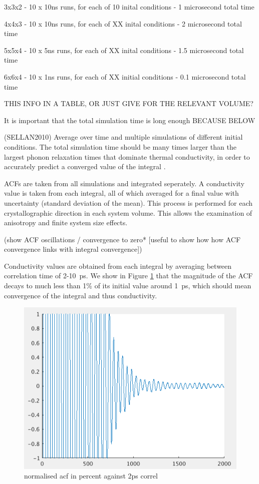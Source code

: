 \documentclass[%
preprint,                                  %
nofootinbib,
 amsmath,amssymb,
 aps,
]{revtex4-1}
\begin{document}
3x3x2 - 10 x 10ns runs, for each of 10 inital conditions - 1 microsecond total time

4x4x3 - 10 x 10ns runs, for each of XX inital conditions - 2 microsecond total time

5x5x4 - 10 x 5ns runs, for each of XX inital conditions - 1.5 microsecond total time 

6x6x4 - 10 x 1ns runs, for each of XX initial conditions - 0.1 microsecond total time

THIS INFO IN A TABLE, OR JUST GIVE FOR THE RELEVANT VOLUME?

It is important that the total simulation time is long enough BECAUSE BELOW

(SELLAN2010) Average over time and multiple simulations of different initial conditions. The total simulation time should be many times larger than the largest phonon relaxation times that dominate thermal conductivity, in order to accurately predict a converged value of the integral .

ACFs are taken from all simulations and integrated seperately. A conductivity value is taken from each integral, all of which averaged for a final value with uncertainty (standard deviation of the mean). This process is performed for each crystallographic direction in each system volume. This allows the examination of anisotropy and finite system size effects.

(show ACF oscillations / convergence to zero* [useful to show how how ACF convergence links with integral convergence])

Conductivity values are obtained from each integral by averaging between correlation time of 2-10~ps. We show in Figure \ref{fig:acf_decay} that the magnitude of the ACF decays to much less than 1\% of its initial value around 1~ps, which should mean convergence of the integral and thus conductivity. %

\begin{figure}[h!]
  \includegraphics[width=\linewidth]{images/acf_decay_percent_correl.png}
  \caption{normalised acf in percent against 2ps correl}
  \label{fig:acf_decay}
\end{figure}
\end{document}
